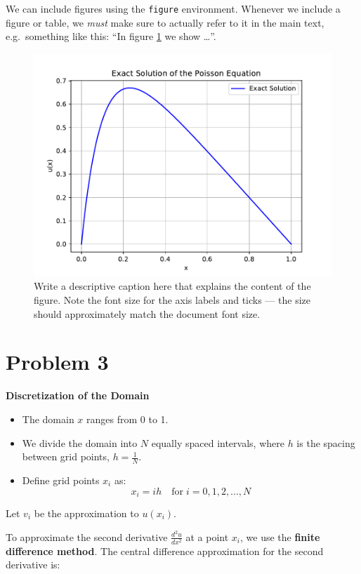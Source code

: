 \documentclass[english,notitlepage]{revtex4-1}  %
\begin{document}
We can include figures using the \texttt{figure} environment. Whenever we include a figure or table, we \textit{must} make sure to actually refer to it in the main text, e.g.\ something like this: ``In figure \ref{fig:rel_err} we show \ldots''.
\begin{figure}%
    \centering %
    \includegraphics[scale=0.75]{problem2/poisson_solution_plot.pdf} %
    \caption{Write a descriptive caption here that explains the content of the figure. Note the font size for the axis labels and ticks --- the size should approximately match the document font size.}
    \label{fig:rel_err}
\end{figure}

\section*{Problem 3}
\textbf{Discretization of the Domain}

\begin{itemize}
    \item The domain $x$ ranges from 0 to 1.
    \item We divide the domain into $N$ equally spaced intervals, where $h$ is the spacing between grid points, $h = \frac{1}{N}$.
    \item Define grid points $x_i$ as:
          $$ x_i = i h \quad \text{for} \; i = 0, 1, 2, \ldots, N $$
\end{itemize}

Let $v_i$ be the approximation to $u(x_i)$.

To approximate the second derivative $\frac{d^2 u}{dx^2}$ at a point $x_i$, we use the \textbf{finite difference method}. The central difference approximation for the second derivative is:
\end{document}
